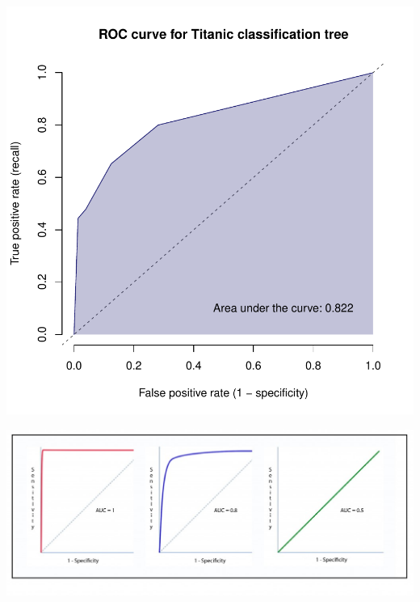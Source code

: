 \documentclass[xcolor=table,aspectratio=169]{beamer}
\begin{document}
\begin{frame}
	\includegraphics[height=\textheight]{pics/Titanic_tree_roc_shaded}
\end{frame}

\begin{frame}
	\includegraphics[width=\textwidth]{pics/ROC_curves-1024x417}
\end{frame}
\end{document}
